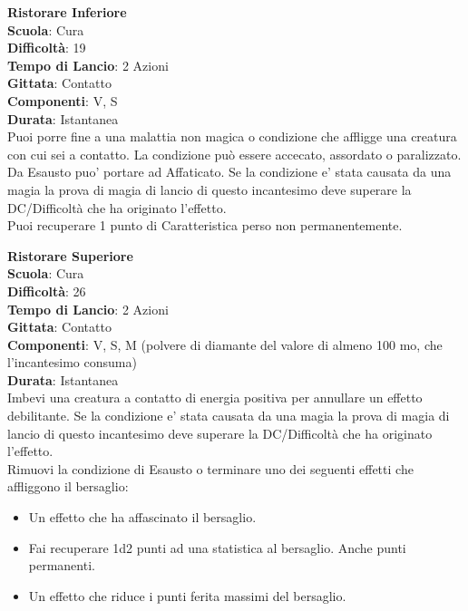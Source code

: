 \begin{multicols}{2}
\medskip\textbf{Ristorare Inferiore}\\
\textbf{Scuola}: Cura\\
\textbf{Difficoltà}: 19\\
\textbf{Tempo di Lancio}: 2 Azioni\\
\textbf{Gittata}: Contatto\\
\textbf{Componenti}: V, S\\
\textbf{Durata}: Istantanea\\
Puoi porre fine a una malattia non magica o condizione che affligge una creatura con cui sei a contatto. La condizione può essere accecato, assordato o paralizzato. Da Esausto puo' portare ad Affaticato. Se la condizione e' stata causata da una magia la prova di magia di lancio di questo incantesimo deve superare la DC/Difficoltà che ha originato l'effetto.\\
Puoi recuperare 1 punto di Caratteristica perso non permanentemente.

\medskip\textbf{Ristorare Superiore}\\
\textbf{Scuola}: Cura\\
\textbf{Difficoltà}: 26\\
\textbf{Tempo di Lancio}: 2 Azioni\\
\textbf{Gittata}: Contatto\\
\textbf{Componenti}: V, S, M (polvere di diamante del valore di almeno 100 mo, che l'incantesimo consuma)\\
\textbf{Durata}: Istantanea\\
Imbevi una creatura a contatto di energia positiva per annullare un effetto debilitante. 
Se la condizione e' stata causata da una magia la prova di magia di lancio di questo incantesimo deve superare la DC/Difficoltà che ha originato l'effetto.\\
Rimuovi la condizione di Esausto o terminare uno dei seguenti effetti che affliggono il bersaglio: 
\medskip
\begin{itemize}
\item
Un effetto che ha affascinato il bersaglio.
\item
Fai recuperare 1d2 punti ad una statistica al bersaglio. Anche punti permanenti.
\item
Un effetto che riduce i punti ferita massimi del bersaglio.
\end{itemize}


\end{multicols}

